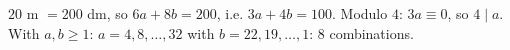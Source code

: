 $20$ m $=200$ dm, so $6a+8b=200$, i.e. $3a+4b=100$. Modulo $4$: $3a\equiv0$, so $4\mid a$. With $a,b\ge1$: $a=4,8,\dots,32$ with $b=22,19,\dots,1$: $\boxed{8}$ combinations.
